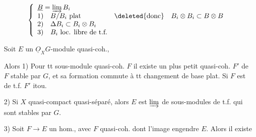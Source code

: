 


\[
\left\{\begin{array}{ll}
\underline B=\varinjlim B_i &\\
1)\quad B/B_i\text{ plat} & \deleted{\text{donc}}\quad B_i\otimes B_i\subset B\otimes B\\
2)\quad \Delta B_i\subset B_i\otimes B_i &\\
3)\quad B_i\text{ loc. libre de t.f.} &
\end{array}\right.
\]

Soit $E$ un $\underline O_X G$-module quasi-coh., 

Alors 1) Pour tt sous-module quasi-coh. $F$ il existe un plus petit  quasi-coh. $F'$ de $F$  stable par $G$, et sa formation commute à tt changement de base plat. Si $F$ est de t.f. $F'$ itou.

2) Si $X$ quasi-compact quasi-séparé, alors $E$ est $\varinjlim$ de sous-modules  de t.f. qui sont stables par $G$.


3) Soit $F\to E$ un hom., avec $F$ quasi-coh.  dont l'image engendre $E$. Alors il existe

